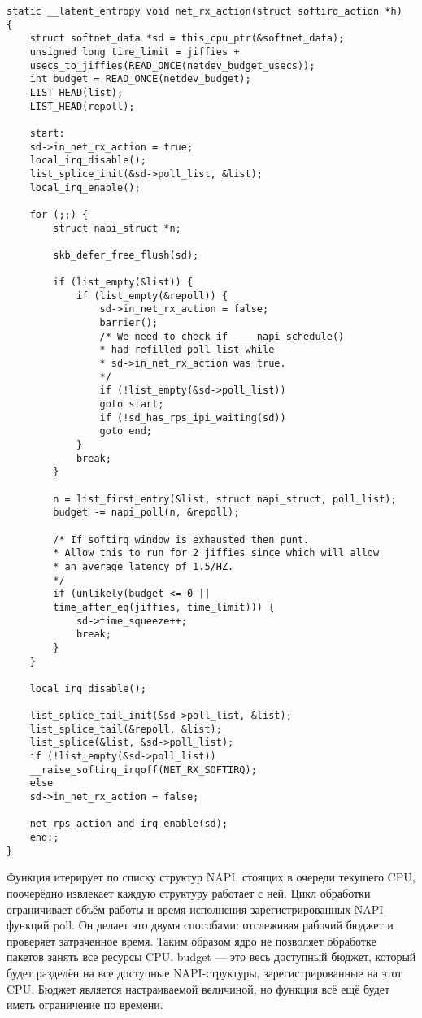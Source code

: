 \begin{center}
	\captionsetup{justification=raggedright,singlelinecheck=off}
	\begin{lstlisting}[label=lst:net_rx_action,caption=Код функции net\_rx\_action,showstringspaces=false]
static __latent_entropy void net_rx_action(struct softirq_action *h)
{
	struct softnet_data *sd = this_cpu_ptr(&softnet_data);
	unsigned long time_limit = jiffies +
	usecs_to_jiffies(READ_ONCE(netdev_budget_usecs));
	int budget = READ_ONCE(netdev_budget);
	LIST_HEAD(list);
	LIST_HEAD(repoll);
	
	start:
	sd->in_net_rx_action = true;
	local_irq_disable();
	list_splice_init(&sd->poll_list, &list);
	local_irq_enable();
	
	for (;;) {
		struct napi_struct *n;
		
		skb_defer_free_flush(sd);
		
		if (list_empty(&list)) {
			if (list_empty(&repoll)) {
				sd->in_net_rx_action = false;
				barrier();
				/* We need to check if ____napi_schedule()
				* had refilled poll_list while
				* sd->in_net_rx_action was true.
				*/
				if (!list_empty(&sd->poll_list))
				goto start;
				if (!sd_has_rps_ipi_waiting(sd))
				goto end;
			}
			break;
		}
		
		n = list_first_entry(&list, struct napi_struct, poll_list);
		budget -= napi_poll(n, &repoll);
		
		/* If softirq window is exhausted then punt.
		* Allow this to run for 2 jiffies since which will allow
		* an average latency of 1.5/HZ.
		*/
		if (unlikely(budget <= 0 ||
		time_after_eq(jiffies, time_limit))) {
			sd->time_squeeze++;
			break;
		}
	}
	
	local_irq_disable();
	
	list_splice_tail_init(&sd->poll_list, &list);
	list_splice_tail(&repoll, &list);
	list_splice(&list, &sd->poll_list);
	if (!list_empty(&sd->poll_list))
	__raise_softirq_irqoff(NET_RX_SOFTIRQ);
	else
	sd->in_net_rx_action = false;
	
	net_rps_action_and_irq_enable(sd);
	end:;
}
	\end{lstlisting}
\end{center}
\FloatBarrier

Функция итерирует по списку структур NAPI, стоящих в очереди текущего CPU, поочерёдно извлекает каждую структуру работает с ней. Цикл обработки ограничивает объём работы и время исполнения зарегистрированных NAPI-функций poll. Он делает это двумя способами: отслеживая рабочий бюджет и проверяет затраченное время. Таким образом ядро не позволяет обработке пакетов занять все ресурсы CPU. budget — это весь доступный бюджет, который будет разделён на все доступные NAPI-структуры, зарегистрированные на этот CPU. Бюджет является настраиваемой величиной, но функция всё ещё будет иметь ограничение по времени.

